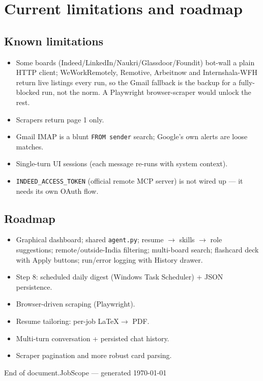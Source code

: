 \documentclass[11pt,a4paper]{article}
\newcommand{\file}[1]{\texttt{\small #1}}
\newcommand{\tool}[1]{\texttt{#1}}
\begin{document}
\section{Current limitations and roadmap}
\label{sec:roadmap}

\subsection{Known limitations}
\begin{itemize}
  \item Some boards (Indeed/LinkedIn/Naukri/Glassdoor/Foundit) bot-wall a plain
        HTTP client; WeWorkRemotely, Remotive, Arbeitnow and Internshala-WFH
        return live listings every run, so the Gmail fallback is the backup for
        a fully-blocked run, not the norm. A Playwright browser-scraper would
        unlock the rest.
  \item Scrapers return page 1 only.
  \item Gmail IMAP is a blunt \tool{FROM sender} search; Google's own alerts
        are loose matches.
  \item Single-turn UI sessions (each message re-runs with system context).
  \item \tool{INDEED\_ACCESS\_TOKEN} (official remote MCP server) is not wired
        up — it needs its own OAuth flow.
\end{itemize}

\subsection{Roadmap}
\begin{itemize}
  \item[\textcolor{green!50!black}{\checkmark}] Graphical dashboard; shared
        \file{agent.py}; resume $\to$ skills $\to$ role suggestions;
        remote/outside-India filtering; multi-board search; flashcard deck
        with Apply buttons; run/error logging with History drawer.
  \item[\textcolor{gray}{$\circ$}] Step 8: scheduled daily digest (Windows Task
        Scheduler) + JSON persistence.
  \item[\textcolor{gray}{$\circ$}] Browser-driven scraping (Playwright).
  \item[\textcolor{gray}{$\circ$}] Resume tailoring: per-job \LaTeX $\to$ PDF.
  \item[\textcolor{gray}{$\circ$}] Multi-turn conversation + persisted chat history.
  \item[\textcolor{gray}{$\circ$}] Scraper pagination and more robust card parsing.
\end{itemize}

\vfill
\begin{center}
{\small\color{gray} End of document.\quad JobScope --- generated \today}
\end{center}
\end{document}
